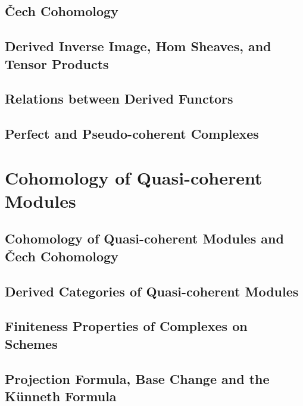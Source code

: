 \documentclass[11pt, a4paper]{article}
\begin{document}
\subsection{\v{C}ech Cohomology}

\subsection{Derived Inverse Image, Hom Sheaves, and Tensor Products}

\subsection{Relations between Derived Functors}

\subsection{Perfect and Pseudo-coherent Complexes}

\section{Cohomology of Quasi-coherent Modules}

\subsection{Cohomology of Quasi-coherent Modules and \v{C}ech Cohomology}

\subsection{Derived Categories of Quasi-coherent Modules}

\subsection{Finiteness Properties of Complexes on Schemes}

\subsection{Projection Formula, Base Change and the K\"unneth Formula}

\end{document}
